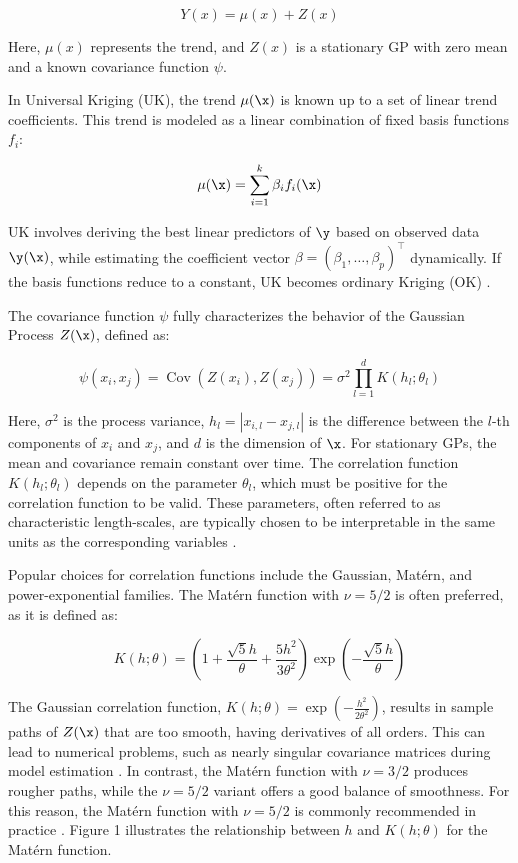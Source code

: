 \documentclass [PhD] {package/uclathes}
\begin{document}
\begin{equation}
    Y(x) = \mu(x) + Z(x)
\end{equation}

Here, \(\mu(x)\) represents the trend, and \(Z(x)\) is a stationary GP with zero mean and a known covariance function \(\psi\).

In Universal Kriging (UK), the trend \(\mu(\x)\) is known up to a set of linear trend coefficients. This trend is modeled as a linear combination of fixed basis functions \(f_i\):

\[
\mu(\x) = \sum_{i=1}^k \beta_i f_i(\x)
\]

UK involves deriving the best linear predictors of \(\y\) based on observed data \(\y(\x)\), while estimating the coefficient vector \(\beta = (\beta_1, \dots, \beta_p)^\top\) dynamically. If the basis functions reduce to a constant, UK becomes ordinary Kriging (OK) \parencite{roustant2012dicekriging}.

The covariance function \(\psi\) fully characterizes the behavior of the Gaussian Process \(Z(\x)\), defined as:

\begin{equation}
\psi(x_i, x_j) = \operatorname{Cov} \left( Z(x_i), Z(x_j) \right) = \sigma^2 \prod_{l=1}^{d} K(h_l ; \theta_l)
\end{equation}

Here, \(\sigma^2\) is the process variance, \(h_l = |x_{i,l} - x_{j,l}|\) is the difference between the \(l\)-th components of \(x_i\) and \(x_j\), and \(d\) is the dimension of \(\x\). For stationary GPs, the mean and covariance remain constant over time. The correlation function \(K(h_l ; \theta_l)\) depends on the parameter \(\theta_l\), which must be positive for the correlation function to be valid. These parameters, often referred to as characteristic length-scales, are typically chosen to be interpretable in the same units as the corresponding variables \parencite{rasmussen2006gaussian}.

Popular choices for correlation functions include the Gaussian, Mat\'ern, and power-exponential families. The Mat\'ern function with \(\nu = 5/2\) is often preferred, as it is defined as:

\[
K(h; \theta) = \left( 1 + \frac{\sqrt{5} h}{\theta} + \frac{5 h^2}{3 \theta^2} \right) \exp \left( -\frac{\sqrt{5} h}{\theta} \right)
\]

The Gaussian correlation function, \(K(h; \theta) = \exp \left( -\frac{h^2}{2\theta^2} \right)\), results in sample paths of \(Z(\x)\) that are too smooth, having derivatives of all orders. This can lead to numerical problems, such as nearly singular covariance matrices during model estimation \parencite{martin2005use}. In contrast, the Mat\'ern function with \(\nu = 3/2\) produces rougher paths, while the \(\nu = 5/2\) variant offers a good balance of smoothness. For this reason, the Mat\'ern function with \(\nu = 5/2\) is commonly recommended in practice \parencite{martin2005use}. Figure 1 illustrates the relationship between \(h\) and \(K(h; \theta)\) for the Mat\'ern function.
\end{document}
